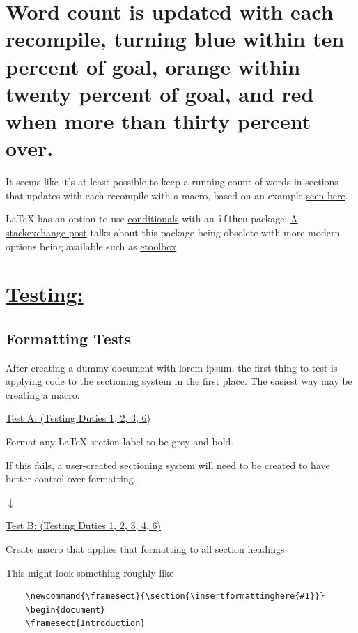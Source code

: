 \documentclass[12pt]{article}
\begin{document}
\section{\large Word count is updated with each recompile, turning blue within ten percent of goal, orange within twenty percent of goal, and red when more than thirty percent over.}

It seems like it's at least possible to keep a running count of words in sections that updates with each recompile with a macro, based on an example \href{https://tex.stackexchange.com/a/44626}{seen here}.

LaTeX has an option to use \href{https://en.wikibooks.org/wiki/LaTeX/Macros#Conditionals}{conditionals} with an \texttt{ifthen} package. \href{https://tex.stackexchange.com/questions/13866/why-is-the-ifthen-package-obsolete}{A stackexchange post} talks about this package being obsolete with more modern options being available such as \href{https://ctan.org/pkg/etoolbox}{etoolbox}.

\vspace{1em}
\section*{\underline{\Large{\textbf{Testing:}}}}

\subsection*{Formatting Tests}

After creating a dummy document with lorem ipsum, the first thing to test is applying code to the sectioning system in the first place. The easiest way may be creating a macro. 

\vspace{0.5em}
\underline{Test A: (Testing Duties 1, 2, 3, 6)}

Format any LaTeX section label to be grey and bold.

If this fails, a user-created sectioning system will need to be created to have better control over formatting.

$\downarrow$

\underline{Test B: (Testing Duties 1, 2, 3, 4, 6)}

Create macro that applies that formatting to all section headings.

This might look something roughly like 
\begin{verbatim}
    \newcommand{\framesect}{\section{\insertformattinghere{#1}}}
    \begin{document}
    \framesect{Introduction}
\end{verbatim}
\end{document}
